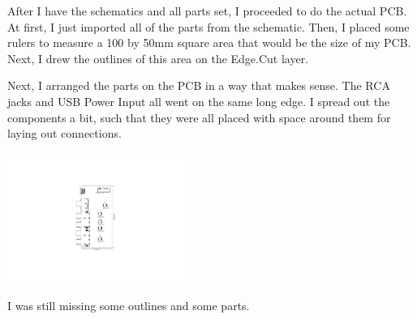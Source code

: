 \documentclass[a4paper]{article}
\begin{document}
After I have the schematics and all parts set, I proceeded to do the actual PCB. At first, I just imported all of the parts from the schematic. Then, I placed some rulers to measure a 100 by 50mm square area that would be the size of my PCB. Next, I drew the outlines of this area on the Edge.Cut layer.

Next, I arranged the parts on the PCB in a way that makes sense. The RCA jacks and USB Power Input all went on the same long edge. I spread out the components a bit, such that they were all placed with space around them for laying out connections.

\begin{center}
  \includegraphics[trim={11cm 5cm 12cm 5cm},clip,width=6cm]{images/pcb.pdf}
\end{center}

I was still missing some outlines and some parts. 
\end{document}
